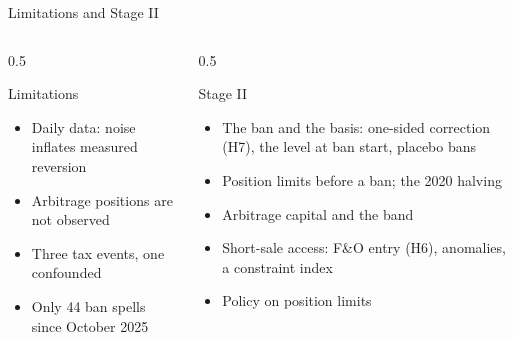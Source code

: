 \documentclass[11pt]{beamer}
\begin{document}
\begin{frame}{Limitations and Stage II}
  \begin{columns}[T]
    \begin{column}{0.5\textwidth}
      \begin{alertblock}{Limitations}
        \scriptsize
        \begin{itemize}
          \item Daily data: noise inflates measured reversion
          \item Arbitrage positions are not observed
          \item Three tax events, one confounded
          \item Only 44 ban spells since October 2025
        \end{itemize}
      \end{alertblock}
    \end{column}
    \begin{column}{0.5\textwidth}
      \begin{exampleblock}{Stage II}
        \scriptsize
        \begin{itemize}
          \item The ban and the basis: one-sided correction (H7), the level at ban start, placebo bans
          \item Position limits before a ban; the 2020 halving
          \item Arbitrage capital and the band
          \item Short-sale access: F\&O entry (H6), anomalies, a constraint index
          \item Policy on position limits
        \end{itemize}
      \end{exampleblock}
    \end{column}
  \end{columns}
\end{frame}
\end{document}
